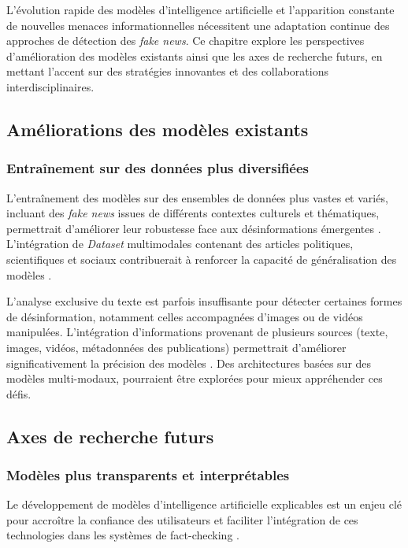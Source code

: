 \documentclass[a4paper,12pt, twocolumn]{article}
\begin{document}
\begin{twocolumn}
L'évolution rapide des modèles d'intelligence artificielle et l'apparition constante de nouvelles menaces informationnelles nécessitent une adaptation continue des approches de détection des \textit{fake news}. Ce chapitre explore les perspectives d'amélioration des modèles existants ainsi que les axes de recherche futurs, en mettant l’accent sur des stratégies innovantes et des collaborations interdisciplinaires.

\subsection{Améliorations des modèles existants}

\subsubsection{Entraînement sur des données plus diversifiées}
L'entraînement des modèles sur des ensembles de données plus vastes et variés, incluant des \textit{fake news} issues de différents contextes culturels et thématiques, permettrait d'améliorer leur robustesse face aux désinformations émergentes \cite{beseiso_context-enhanced_2025}. L'intégration de \textit{Dataset} multimodales contenant des articles politiques, scientifiques et sociaux contribuerait à renforcer la capacité de généralisation des modèles \cite{beseiso_context-enhanced_2025}.

\bigskip
L'analyse exclusive du texte est parfois insuffisante pour détecter certaines formes de désinformation, notamment celles accompagnées d’images ou de vidéos manipulées. L'intégration d'informations provenant de plusieurs sources (texte, images, vidéos, métadonnées des publications) permettrait d'améliorer significativement la précision des modèles \cite{beseiso_context-enhanced_2025}. Des architectures basées sur des modèles multi-modaux, pourraient être explorées pour mieux appréhender ces défis.



\subsection{Axes de recherche futurs}
\subsubsection{Modèles plus transparents et interprétables}
Le développement de modèles d’intelligence artificielle explicables est un enjeu clé pour accroître la confiance des utilisateurs et faciliter l’intégration de ces technologies dans les systèmes de fact-checking \cite{kaliyar_fakebert_2021}.


\end{twocolumn}
\end{document}
